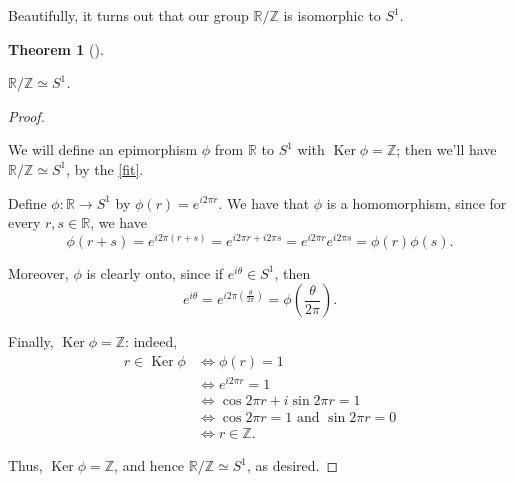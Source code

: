 \documentclass[10pt,]{book}
\theoremstyle{plain}
\newtheorem{theorem}{Theorem}[section]
\theoremstyle{definition}
\theoremstyle{definition}
\theoremstyle{definition}
\theoremstyle{definition}
\numberwithin{equation}{section}
\def\Z{\mathbb{Z}}
\def\R{\mathbb{R}}
\DeclareMathOperator{\Ker}{Ker}
\newcommand{\amp}{ & }
\begin{document}
\par
 Beautifully, it turns out that our group \(\R/\Z\) is
      isomorphic to \(S^1\).%
\begin{theorem}[{}]\label{theorem-63}

        \(\R/\Z \simeq S^1\).
\end{theorem}
\begin{proof}\hypertarget{proof-54}{}

      We will define an epimorphism \(\phi\) from \(\R\) to \(S^1\)
      with \(\Ker \phi=\Z\); then we'll have \(\R/\Z \simeq S^1\),
      by the \hyperref[fit]{\ref{fit}}.
\par

      Define \(\phi:\R \to S^1\) by \(\phi(r)=e^{i2\pi r}\). We have
      that \(\phi\) is a homomorphism, since for every \(r,s\in \R\),
      we have
\begin{equation*}

        \phi(r+s)=e^{i2\pi (r+s)}=e^{i2\pi r+i2\pi s}=e^{i2\pi
        r}e^{i2\pi s}=\phi(r)\phi(s).
      
\end{equation*}

\par

      Moreover, \(\phi\) is clearly
      onto, since if \(e^{i\theta}\in S^1\), then
\begin{equation*}

        e^{i\theta}=e^{i2\pi\left(\frac{\theta}{2\pi}\right)}=\phi\left(\frac{\theta}{2\pi}\right).
      
\end{equation*}

\par

      Finally, \(\Ker\phi=\Z\): indeed,
\begin{align*}
r\in \Ker\phi \amp \Leftrightarrow \phi(r)=1\\
\amp \Leftrightarrow e^{i2\pi r}=1\\
\amp \Leftrightarrow \cos 2\pi r + i\sin 2\pi r=1\\
\amp \Leftrightarrow \cos 2\pi r = 1 \text{ and } \sin 2\pi r = 0\\
\amp \Leftrightarrow r\in \Z.
\end{align*}

\par

      Thus, \(\Ker \phi = \Z\), and hence \(\R/\Z\simeq S^1\), as
      desired.
\end{proof}
\typeout{************************************************}
\typeout{************************************************}
\end{document}
